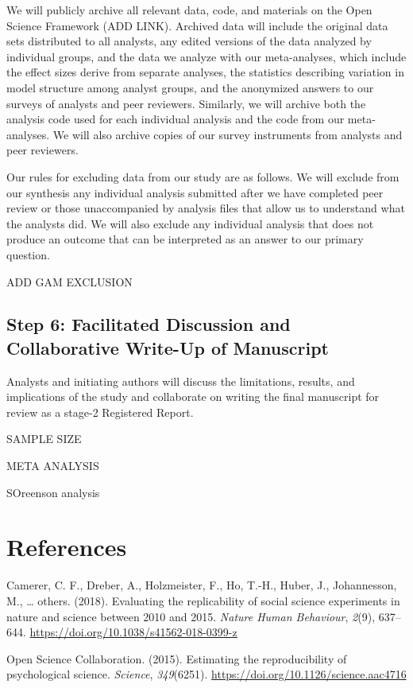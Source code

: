 \documentclass[
  english,
  man]{apa6}
\begin{document}
We will publicly archive all relevant data, code, and materials on the Open Science Framework (ADD LINK).
Archived data will include the original data sets distributed to all analysts, any edited versions of the data analyzed by individual groups, and the data we analyze with our meta-analyses, which include the effect sizes derive from separate analyses, the statistics describing variation in model structure among analyst groups, and the anonymized answers to our surveys of analysts and peer reviewers.
Similarly, we will archive both the analysis code used for each individual analysis and the code from our meta-analyses.
We will also archive copies of our survey instruments from analysts and peer reviewers.

Our rules for excluding data from our study are as follows.
We will exclude from our synthesis any individual analysis submitted after we have completed peer review or those unaccompanied by analysis files that allow us to understand what the analysts did.
We will also exclude any individual analysis that does not produce an outcome that can be interpreted as an answer to our primary question.

ADD GAM EXCLUSION

\hypertarget{step-6-facilitated-discussion-and-collaborative-write-up-of-manuscript}{%
\subsection{Step 6: Facilitated Discussion and Collaborative Write-Up of Manuscript}\label{step-6-facilitated-discussion-and-collaborative-write-up-of-manuscript}}

Analysts and initiating authors will discuss the limitations, results, and implications of the study and collaborate on writing the final manuscript for review as a stage-2 Registered Report.

SAMPLE SIZE

META ANALYSIS

SOreenson analysis

\newpage

\hypertarget{references}{%
\section{References}\label{references}}

\begingroup
\setlength{\parindent}{-0.5in}
\setlength{\leftskip}{0.5in}

\hypertarget{refs}{}
\leavevmode\hypertarget{ref-camerer2018evaluating}{}%
Camerer, C. F., Dreber, A., Holzmeister, F., Ho, T.-H., Huber, J., Johannesson, M., \ldots{} others. (2018). Evaluating the replicability of social science experiments in nature and science between 2010 and 2015. \emph{Nature Human Behaviour}, \emph{2}(9), 637--644. \url{https://doi.org/10.1038/s41562-018-0399-z}

\leavevmode\hypertarget{ref-open2015estimating}{}%
Open Science Collaboration. (2015). Estimating the reproducibility of psychological science. \emph{Science}, \emph{349}(6251). \url{https://doi.org/10.1126/science.aac4716}

\endgroup
\end{document}
